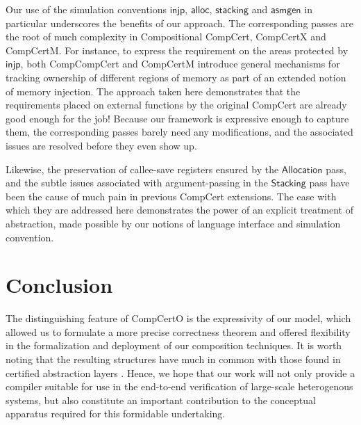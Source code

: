 \documentclass[acmsmall,screen,review,anonymous]{acmart}
\newcommand{\kw}[1]{\ensuremath{ \mathsf{#1} }}
\begin{document}
Our use of the simulation conventions
\kw{injp}, \kw{alloc}, \kw{stacking} and \kw{asmgen}
in particular
underscores the benefits of our approach.
The corresponding passes are the root of
much complexity
in Compositional CompCert, CompCertX and CompCertM.
For instance,
to express the requirement on
the areas protected by \kw{injp},
both CompCompCert and CompCertM
introduce general mechanisms for tracking ownership of
different regions of memory
as part of an extended notion of memory injection.
The approach taken here demonstrates that
the requirements placed on external functions
by the original CompCert
are already good enough for the job!
Because our framework is expressive enough to capture them,
the corresponding passes barely need any modifications,
and the associated issues are resolved before they even show up.

Likewise, the preservation of callee-save registers
ensured by the \kw{Allocation} pass,
and the subtle issues associated with argument-passing
in the \kw{Stacking} pass
have been the cause of much pain
in previous CompCert extensions.
The ease with which they are addressed here
demonstrates the power of
an explicit treatment of abstraction,
made possible
by our notions of language interface and simulation convention.


\section{Conclusion} \label{sec:concl} %

The distinguishing feature of CompCertO
is the expressivity of our model,
which allowed us to formulate a more precise correctness theorem
and offered flexibility
in the formalization and deployment of
our composition techniques.
It is worth noting that
the resulting structures have much in common with
those found in
certified abstraction layers \cite{popl15,rbgs-cal}.
Hence,
we hope that our work will not only
provide a compiler
suitable for use in the end-to-end verification of
large-scale heterogenous systems,
but also constitute an important contribution
to the conceptual apparatus
required for this formidable undertaking.



\end{document}
